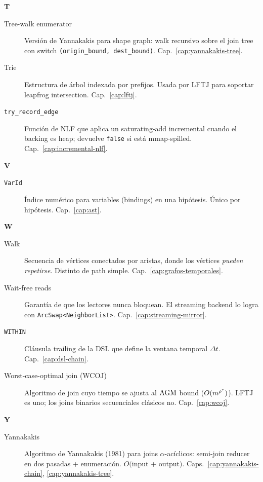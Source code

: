 \noindent
\textbf{T}

\begin{description}
    \item[Tree-walk enumerator] Versión de Yannakakis para shape
    graph: walk recursivo sobre el join tree con switch
    \texttt{(origin\_bound, dest\_bound)}.
    Cap.~\ref{cap:yannakakis-tree}.

    \item[Trie] Estructura de árbol indexada por prefijos. Usada
    por LFTJ para soportar leapfrog intersection.
    Cap.~\ref{cap:lftj}.

    \item[\texttt{try\_record\_edge}] Función de NLF que aplica
    un saturating-add incremental cuando el backing es heap;
    devuelve \texttt{false} si está mmap-spilled.
    Cap.~\ref{cap:incremental-nlf}.
\end{description}

\noindent
\textbf{V}

\begin{description}
    \item[\texttt{VarId}] Índice numérico para variables (bindings)
    en una hipótesis. Único por hipótesis.
    Cap.~\ref{cap:ast}.
\end{description}

\noindent
\textbf{W}

\begin{description}
    \item[Walk] Secuencia de vértices conectados por aristas, donde
    los vértices \emph{pueden repetirse}. Distinto de path simple.
    Cap.~\ref{cap:grafos-temporales}.

    \item[Wait-free reads] Garantía de que los lectores nunca
    bloquean. El streaming backend lo logra con
    \texttt{ArcSwap<NeighborList>}. Cap.~\ref{cap:streaming-mirror}.

    \item[\texttt{WITHIN}] Cláusula trailing de la DSL que define
    la ventana temporal \(\Delta t\). Cap.~\ref{cap:dsl-chain}.

    \item[Worst-case-optimal join (WCOJ)] Algoritmo de join cuyo
    tiempo se ajusta al \(\mathrm{AGM}\) bound (\(O(m^{\rho^{*}})\)). LFTJ
    es uno; los joins binarios secuenciales clásicos no.
    Cap.~\ref{cap:wcoj}.
\end{description}

\noindent
\textbf{Y}

\begin{description}
    \item[Yannakakis] Algoritmo de Yannakakis (1981) para joins
    \(\alpha\)-acíclicos: semi-join reducer en dos pasadas +
    enumeración. \(O(\)input + output\()\). Caps.~\ref{cap:yannakakis-chain},
    \ref{cap:yannakakis-tree}.
\end{description}

\cleardoublepage
